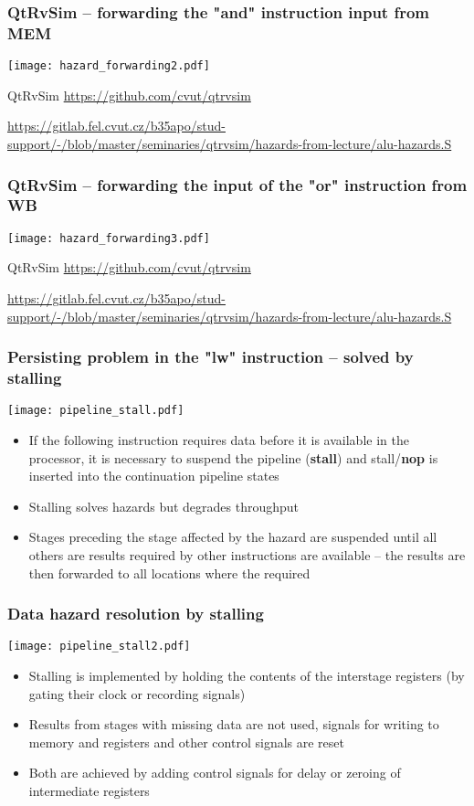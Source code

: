 \documentclass{beamer}
\begin{document}
\begin{frame}
\frametitle{QtRvSim -- forwarding the "and" instruction input from MEM}
\texttt{[image: hazard\_forwarding2.pdf]}

{\tiny
QtRvSim \url{https://github.com/cvut/qtrvsim}
}

{\Tiny
\url{https://gitlab.fel.cvut.cz/b35apo/stud-support/-/blob/master/seminaries/qtrvsim/hazards-from-lecture/alu-hazards.S}
}

\end{frame}

\begin{frame}
\frametitle{QtRvSim -- forwarding the input of the "or" instruction from WB}
\texttt{[image: hazard\_forwarding3.pdf]}

{\tiny
QtRvSim \url{https://github.com/cvut/qtrvsim}
}

{\Tiny
\url{https://gitlab.fel.cvut.cz/b35apo/stud-support/-/blob/master/seminaries/qtrvsim/hazards-from-lecture/alu-hazards.S}
}

\end{frame}

\begin{frame}
\frametitle{Persisting problem in the "lw" instruction -- solved by stalling}
\texttt{[image: pipeline\_stall.pdf]}

\begin{itemize}
 \item If the following instruction requires data before it is available in the processor, it is necessary to
       suspend the pipeline (\textbf{stall}) and stall/\textbf{nop} is inserted into the continuation pipeline
       states
 \item Stalling solves hazards but degrades throughput
 \item Stages preceding the stage affected by the hazard are suspended until all others are
       results required by other instructions are available -- the results are then forwarded to all locations where
       the required
\end{itemize}

\end{frame}

\begin{frame}
\frametitle{Data hazard resolution by stalling}
\texttt{[image: pipeline\_stall2.pdf]}

\begin{itemize}
 \item Stalling is implemented by holding the contents of the interstage registers
       (by gating their clock or recording signals)
 \item Results from stages with missing data are not used, signals
       for writing to memory and registers and other control signals  are reset
 \item Both are achieved by adding control signals for delay or
       zeroing of intermediate registers
\end{itemize}

\end{frame}
\end{document}

